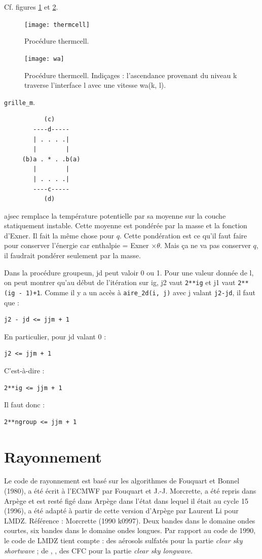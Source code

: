 \documentclass[a4paper,english,french]{article}
\newcommand{\Eng}[1]{\textit{\foreignlanguage{english}{#1}}}
\begin{document}
Cf. figures \ref{fig:thermcell} et \ref{fig:wa}.
\begin{figure}
  \centering
  \texttt{[image: thermcell]}
  \caption[Procédure thermcell]{Procédure thermcell.}
  \label{fig:thermcell}
\end{figure}
\begin{figure}
  \centering
  \texttt{[image: wa]}
  \caption[Indi\c cages dans thermcell]{Procédure thermcell. Indi\c
    cages : l'ascendance provenant du niveau k traverse l'interface l
    avec une vitesse wa(k, l).}
  \label{fig:wa}
\end{figure}

\verb+grille_m+.
\begin{verbatim}
           (c)
        ----d-----
        | . . . .|
        |        |
     (b)a . * . .b(a)
        |        |
        | . . . .|
        ----c-----
           (d)
\end{verbatim}

ajsec remplace la température potentielle par sa moyenne sur la couche
statiquement instable. Cette moyenne est pondérée par la masse et la
fonction d’Exner. Il fait la même chose pour $q$. Cette pondération est
ce qu’il faut faire pour conserver l’énergie car enthalpie = Exner
$\times \theta$. Mais ça ne va pas conserver $q$, il faudrait pondérer
seulement par la masse.

Dans la procédure groupeun, jd peut valoir 0 ou 1. Pour une valeur
donnée de l, on peut montrer qu'au début de l'itération sur ig, j2
vaut \verb+2**ig+ et j1 vaut \verb|2**(ig - 1)+1|. Comme il y a un
accès à \verb+aire_2d(i, j)+ avec j valant \verb+j2-jd+, il faut que :
\begin{verbatim}
j2 - jd <= jjm + 1
\end{verbatim}
En particulier, pour jd valant 0 :
\begin{verbatim}
j2 <= jjm + 1
\end{verbatim}
C'est-à-dire :
\begin{verbatim}
2**ig <= jjm + 1
\end{verbatim}
Il faut donc :
\begin{verbatim}
2**ngroup <= jjm + 1
\end{verbatim}

\section{Rayonnement}

Le code de rayonnement est basé sur les algorithmes de Fouquart et
Bonnel (1980), a été écrit à l'ECMWF par Fouquart et J.-J. Morcrette,
a été repris dans Arpège et est resté figé dans Arpège dans l'état
dans lequel il était au cycle 15 (1996), a été adapté à partir de
cette version d'Arpège par Laurent Li pour LMDZ. Référence : Morcrette
(1990 k0997). Deux bandes dans le domaine ondes courtes, six bandes
dans le domaine ondes longues. Par rapport au code de 1990, le code de
LMDZ tient compte : des aérosols sulfatés pour la partie \Eng{clear
  sky shortwave} ; de , , des CFC pour la partie
\Eng{clear sky longwave}.
\end{document}
